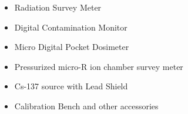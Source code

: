 \begin{itemize}
    \item Radiation Survey Meter
    \item Digital Contamination Monitor
    \item Micro Digital Pocket Dosimeter
    \item Pressurized micro-R ion chamber survey meter
    \item Cs-137 source with Lead Shield
    \item Calibration Bench and other accessories
\end{itemize}